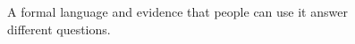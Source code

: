 \begin{figure}[H]
\centering
{}
\caption{A formal language and evidence that people can use it answer different questions.}\label{fig:teach-P-02-literature-02}
\end{figure}
